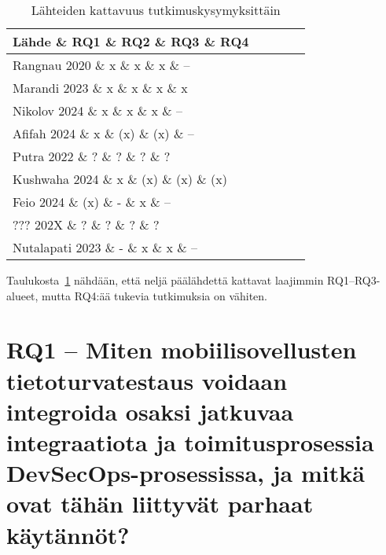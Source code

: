 \documentclass[bscthesis,finnish,oneside,biblatex]{uefcsthesis}
\begin{document}
\begin{table}[h]
  \caption{Lähteiden kattavuus tutkimuskysymyksittäin}
  \label{tab:rq_matrix}
  \footnotesize
  \begin{tabular}{lcccc}
    \toprule
    Lähde \& RQ1 \& RQ2 \& RQ3 \& RQ4 \\
    \midrule
    Rangnau 2020 \& x \& x \& x \& – \\
    Marandi 2023 \& x \& x \& x \& x \\
    Nikolov 2024 \& x \& x \& x \& – \\
    Afifah 2024  \& x \& (x) \& (x) \& – \\
    Putra 2022  \& ? \& ? \& ? \& ? \\
    Kushwaha 2024  \& x \& (x) \& (x) \& (x) \\
    Feio  2024  \& (x) \& - \& x \& – \\
    ??? 202X   \& ? \& ? \& ? \& ? \\
    Nutalapati 2023  \& - \& x \& x \& – \\
    \bottomrule
  \end{tabular}
\end{table}

Taulukosta~\ref{tab:rq_matrix} nähdään, että neljä päälähdettä
kattavat laajimmin RQ1–RQ3-alueet, mutta RQ4:ää tukevia tutkimuksia on
vähiten.

\section{RQ1 – Miten mobiilisovellusten tietoturvatestaus voidaan integroida osaksi jatkuvaa integraatiota ja toimitusprosessia DevSecOps-prosessissa, ja mitkä ovat tähän liittyvät parhaat käytännöt?}
\label{sec:rq1}
\end{document}
